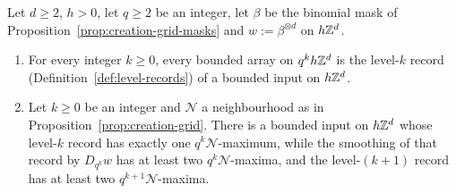 \begin{proposition}
\label{prop:binomial-records}

Let $d \ge 2$, $h > 0$, let $q \ge 2$ be an integer, let $\beta$ be the binomial mask of
Proposition~\ref{prop:creation-grid-masks} and $w := \beta^{\otimes d}$ on $h\mathbb{Z}^d$.
\begin{enumerate}
\item For every integer $k \ge 0$, every bounded array on $q^kh\mathbb{Z}^d$ is the level-$k$ record
(Definition~\ref{def:level-records}) of a bounded input on $h\mathbb{Z}^d$.
\item Let $k \ge 0$ be an integer and $\mathcal{N}$ a neighbourhood as in
Proposition~\ref{prop:creation-grid}. There is a bounded input on $h\mathbb{Z}^d$ whose level-$k$ record
has exactly one $q^k\mathcal{N}$-maximum, while the smoothing of that record by $D_{q^k}w$ has at
least two $q^k\mathcal{N}$-maxima, and the level-$(k+1)$ record has at least two
$q^{k+1}\mathcal{N}$-maxima.
\end{enumerate}
\end{proposition}

